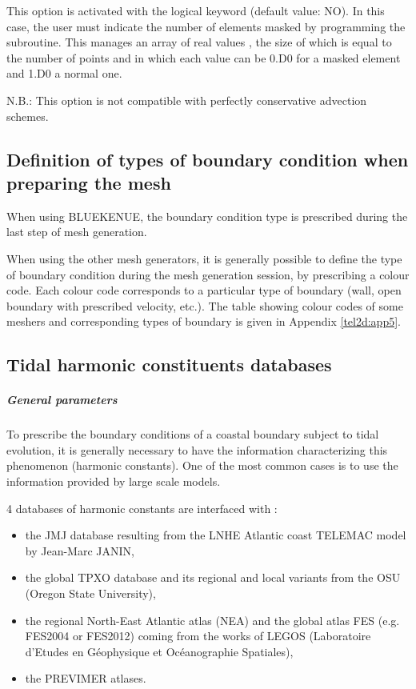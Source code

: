This option is activated with the logical keyword
 (default value: NO).
In this case, the user must indicate the number of elements masked
by programming the  subroutine.
This manages an array of real values , the size of which
is equal to the number of points and in which each value can be 0.D0
for a masked element and 1.D0 a normal one.

N.B.: This option is not compatible with perfectly conservative advection schemes.


\subsection{Definition of types of boundary condition when preparing the mesh}

When using BLUEKENUE, the boundary condition type is prescribed during the last
step of mesh generation.

When using the other mesh generators, it is generally possible to define
the type of boundary condition during the mesh generation session, by prescribing
a colour code.
Each colour code corresponds to a particular type of boundary
(wall, open boundary with prescribed velocity, etc.).
The table showing colour codes of some meshers and corresponding types of
boundary is given in Appendix \ref{tel2d:app5}.


\subsection{Tidal harmonic constituents databases}
\label{subs:tidal:harm:datab}

\subparagraph{General parameters}

To prescribe the boundary conditions of a coastal boundary subject to tidal
evolution, it is generally necessary to have the information characterizing
this phenomenon (harmonic constants).
One of the most common cases is to use the information provided by large scale
models.

4 databases of harmonic constants are interfaced with :

\begin{itemize}
\item the JMJ database resulting from the LNHE Atlantic coast TELEMAC model by
Jean-Marc JANIN,

\item the global TPXO database and its regional and local variants from the OSU
(Oregon State University),

\item the regional North-East Atlantic atlas (NEA) and the global atlas FES
(e.g. FES2004 or FES2012) coming from the works of LEGOS
(Laboratoire d'Etudes en G\'{e}ophysique et Oc\'{e}anographie Spatiales),

\item the PREVIMER atlases.
\end{itemize}

